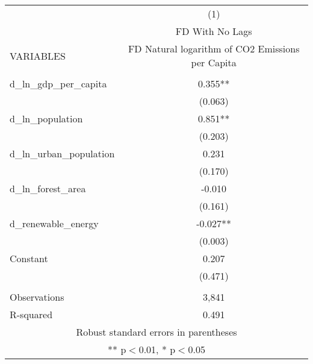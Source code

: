 \begin{tabular}{lc} \hline
 & (1) \\
 & FD With No Lags \\
VARIABLES & FD Natural logarithm of CO2 Emissions per Capita \\ \hline
 &  \\
d\_ln\_gdp\_per\_capita & 0.355** \\
 & (0.063) \\
d\_ln\_population & 0.851** \\
 & (0.203) \\
d\_ln\_urban\_population & 0.231 \\
 & (0.170) \\
d\_ln\_forest\_area & -0.010 \\
 & (0.161) \\
d\_renewable\_energy & -0.027** \\
 & (0.003) \\
Constant & 0.207 \\
 & (0.471) \\
 &  \\
Observations & 3,841 \\
 R-squared & 0.491 \\ \hline
\multicolumn{2}{c}{ Robust standard errors in parentheses} \\
\multicolumn{2}{c}{ ** p$<$0.01, * p$<$0.05} \\
\end{tabular}
